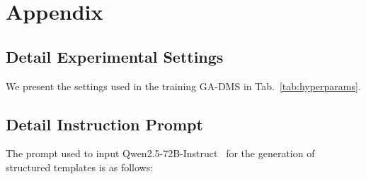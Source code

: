 % 
% 

\appendix
\section{Appendix}
\subsection{Detail Experimental Settings}
\label{Appendix hyper}
We present the settings used in the training GA-DMS in Tab.~\ref{tab:hyperparams}.


\begin{table}[h]
    \centering
\centering
\caption{Hyperparameters used for GA-DMS pre-training.}
\label{tab:hyperparams}
\vspace{-5mm}
\end{table}

\subsection{Detail Instruction Prompt}
\label{Appendix prompt}
The prompt used to input Qwen2.5-72B-Instruct~\cite{yang2024qwen2} for the generation of structured templates is as follows:

